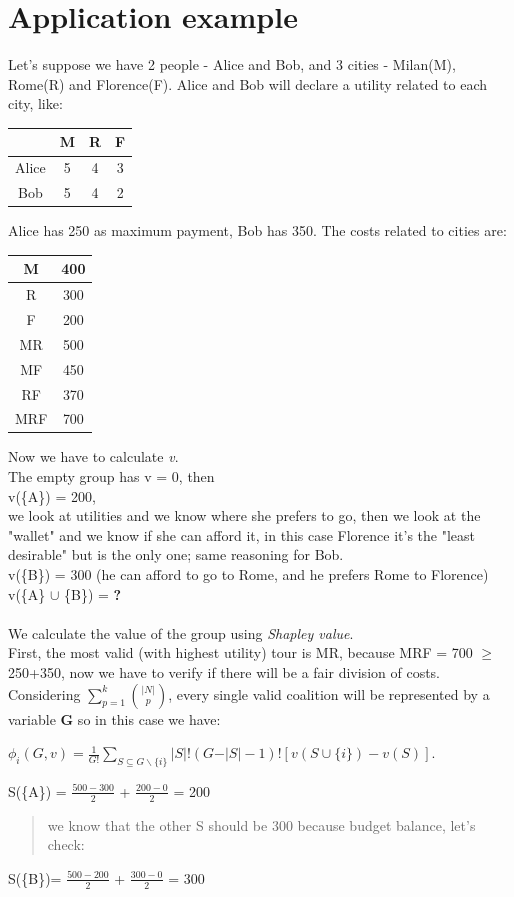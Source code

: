 \documentclass{article}
\begin{document}
\section{Application example}
\Large{
Let's suppose we have 2 people - Alice and Bob, and 3 cities - Milan(M), Rome(R) and Florence(F). Alice and Bob will declare a utility related to each city, like:
\begin{center}
\begin{tabular}{ |c|c|c|c| } 
 \hline
  & M & R & F \\ 
 \hline
 Alice & 5 & 4 & 3\\ 
 \hline
 Bob & 5 & 4 & 2\\ 
 \hline
\end{tabular}\newpage
\end{center}
Alice has 250 as maximum payment, Bob has 350. The costs related to cities are:
\begin{center}
\begin{tabular}{ |c|c| } 
 \hline
 M & 400 \\ 
 \hline
 R & 300\\ 
 \hline
 F & 200\\ 
 \hline
 MR & 500\\ 
 \hline
 MF & 450\\ 
 \hline
 RF & 370\\ 
 \hline
 MRF & 700\\ 
 \hline
\end{tabular}
\end{center}
Now we have to calculate \textit{v}. \\The empty group has v = 0, then \\v(\{A\}) = 200, \\we look at utilities and we know where she prefers to go, then we look at the "wallet" and we know if she can afford it, in this case Florence it's the "least desirable" but is the only one; same reasoning for Bob.\\
v(\{B\}) = 300 (he can afford to go to Rome, and he prefers Rome to Florence)\\
v(\{A\} $\cup$ \{B\}) = \textbf{?} \\\\
We calculate the value of the group using \textit{Shapley value}.\\
First, the most valid (with highest utility) tour is MR, because MRF = 700 $\ge$ 250+350, now we have to verify if there will be a fair division of costs.\\
Considering $\displaystyle\sum_{p=1}^k \binom {\vert N \vert} {p}$, every single valid coalition will be represented by a variable \textbf{G} so in this case we have:
\begin{center}
   \normalsize{
        $\phi_i(G,v) = \frac{1}{G!} \displaystyle \sum_{S \subseteq G \backslash \{i\}} \vert S \vert!(G -  \vert S \vert - 1)! [v(S \cup \{i\}) - v(S)]$.
    }
\end{center}
S(\{A\}) = $\frac {500 - 300} {2}$ + $\frac {200 - 0} {2}$  = 200
\begin{quote}
    we know that the other S should be 300 because budget balance, let's check:
\end{quote}
S(\{B\})= $\frac {500 - 200} {2}$ + $\frac {300 - 0} {2}$ = 300
}
\end{document}
